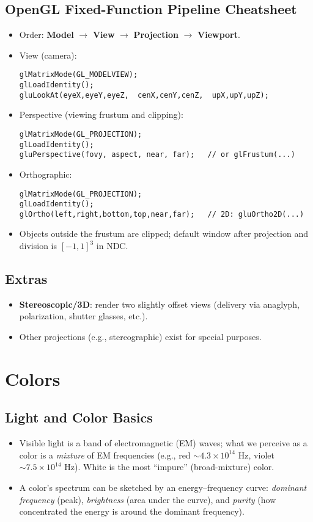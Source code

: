 \documentclass[8pt,twocolumn]{extarticle}
\begin{document}
\subsection*{OpenGL Fixed-Function Pipeline Cheatsheet}
\begin{itemize}
  \item Order: \textbf{Model} \(\rightarrow\) \textbf{View} \(\rightarrow\) \textbf{Projection} \(\rightarrow\) \textbf{Viewport}.
  \item View (camera): 
\begin{verbatim}
glMatrixMode(GL_MODELVIEW);
glLoadIdentity();
gluLookAt(eyeX,eyeY,eyeZ,  cenX,cenY,cenZ,  upX,upY,upZ);
\end{verbatim}
  \item Perspective (viewing frustum and clipping):
\begin{verbatim}
glMatrixMode(GL_PROJECTION);
glLoadIdentity();
gluPerspective(fovy, aspect, near, far);   // or glFrustum(...)
\end{verbatim}
  \item Orthographic:
\begin{verbatim}
glMatrixMode(GL_PROJECTION);
glLoadIdentity();
glOrtho(left,right,bottom,top,near,far);   // 2D: gluOrtho2D(...)
\end{verbatim}
  \item Objects outside the frustum are clipped; default window after projection and division is \([-1,1]^3\) in NDC.
\end{itemize}

\subsection*{Extras}
\begin{itemize}
  \item \textbf{Stereoscopic/3D}: render two slightly offset views (delivery via anaglyph, polarization, shutter glasses, etc.).
  \item Other projections (e.g., stereographic) exist for special purposes.
\end{itemize}
\section{Colors}

\subsection*{Light and Color Basics}
\begin{itemize}
  \item Visible light is a band of electromagnetic (EM) waves; what we perceive as a color is a \emph{mixture} of EM frequencies (e.g., red $\sim 4.3\times10^{14}$ Hz, violet $\sim 7.5\times10^{14}$ Hz). White is the most ``impure'' (broad-mixture) color.
  \item A color’s spectrum can be sketched by an energy–frequency curve: \emph{dominant frequency} (peak), \emph{brightness} (area under the curve), and \emph{purity} (how concentrated the energy is around the dominant frequency).
\end{itemize}
\end{document}

